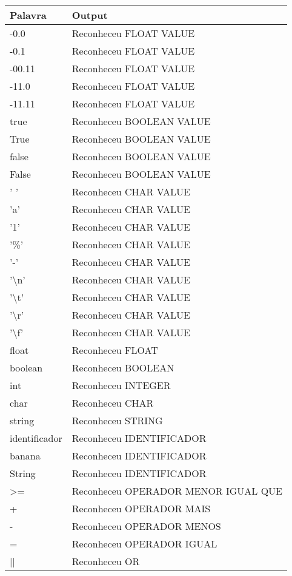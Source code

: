 \documentclass[
	article,			%
	11pt,				%
	oneside,			%
	a4paper,			%
	portuguese,			%
	brazil,				%
	sumario=tradicional
	]{abntex2}
\begin{document}
\begin{center}
\begin{table}[H]
\begin{tabularx}{1\textwidth}{p{5cm}|X}
Palavra & Output \\
\hline
-0.0 & Reconheceu FLOAT VALUE \\
-0.1 & Reconheceu FLOAT VALUE \\
-00.11 & Reconheceu FLOAT VALUE \\
-11.0 & Reconheceu FLOAT VALUE \\
-11.11 & Reconheceu FLOAT VALUE \\
true & Reconheceu BOOLEAN VALUE \\
True & Reconheceu BOOLEAN VALUE \\
false & Reconheceu BOOLEAN VALUE \\
False & Reconheceu BOOLEAN VALUE \\
' ' & Reconheceu CHAR VALUE \\
'a' & Reconheceu CHAR VALUE \\
'1' & Reconheceu CHAR VALUE \\
'\%' & Reconheceu CHAR VALUE \\
'-' & Reconheceu CHAR VALUE \\
'\textbackslash n' & Reconheceu CHAR VALUE \\
'\textbackslash t' & Reconheceu CHAR VALUE \\
'\textbackslash r' & Reconheceu CHAR VALUE \\
'\textbackslash f' & Reconheceu CHAR VALUE \\
float & Reconheceu FLOAT \\
boolean & Reconheceu BOOLEAN \\
int & Reconheceu INTEGER \\ 
char & Reconheceu CHAR \\
string & Reconheceu STRING \\
identificador & Reconheceu IDENTIFICADOR \\
banana & Reconheceu IDENTIFICADOR \\ 
String & Reconheceu IDENTIFICADOR \\
>= & Reconheceu OPERADOR MENOR IGUAL QUE \\ 
+ & Reconheceu OPERADOR MAIS \\
- & Reconheceu OPERADOR MENOS \\
= & Reconheceu OPERADOR IGUAL \\
|| & Reconheceu OR \\ \hline
\end{tabularx}
\end{table}


\end{center}
\end{document}
